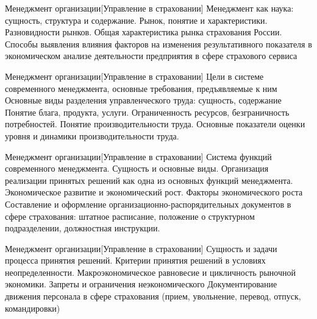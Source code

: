 \documentclass[
	11pt,
	a4paper,
	]
	{article}
\begin{document}
\vfill



\begin{minipage}[t][\miniH]{\miniL}\centering
	 {Менеджмент организации}[Управление в страховании]
		{
			Менеджмент как наука: сущность, структура и содержание.
		}{
			Рынок, понятие и характеристики. Разновидности рынков. Общая характеристика рынка страхования России.
		}{
			Способы выявления влияния факторов на изменения результативного показателя в экономическом анализе деятельности предприятия в сфере страхового сервиса
		}
	\lowGE
\end{minipage}

\vfill



\begin{minipage}[t][\miniH]{\miniL}\centering
	 {Менеджмент организации}[Управление в страховании]
		{
			Цели в системе современного менеджмента, основные требования, предъявляемые к ним Основные виды разделения управленческого труда: сущность, содержание
		}{
			Понятие блага, продукта, услуги. Ограниченность ресурсов, безграничность потребностей.
		}{
			Понятие производительности труда. Основные показатели оценки уровня и динамики производительности труда.
		}
	\lowGE
\end{minipage}





\begin{minipage}[t][\miniH]{\miniL}\centering
	 {Менеджмент организации}[Управление в страховании]
		{
			Система функций современного менеджмента. Сущность и основные виды. Организация реализации принятых решений как одна из основных функций менеджмента.
		}{
			Экономическое развитие и экономический рост. Факторы экономического роста
		}{
			Составление и оформление организационно-распорядительных документов в сфере страхования: штатное расписание, положение о структурном подразделении, должностная инструкции.
		}
	\lowGE
\end{minipage}

\vfill



\begin{minipage}[t][\miniH]{\miniL}\centering
	 {Менеджмент организации}[Управление в страховании]
		{
			Сущность и задачи процесса принятия решений. Критерии принятия решений в условиях неопределенности.
		}{
			Макроэкономическое равновесие и цикличность рыночной экономики. Запреты и ограничения неэкономического
		}{
			Документирование движения персонала в сфере страхования (прием, увольнение, перевод, отпуск, командировки)
		}
	\lowGE
\end{minipage}
\end{document}
